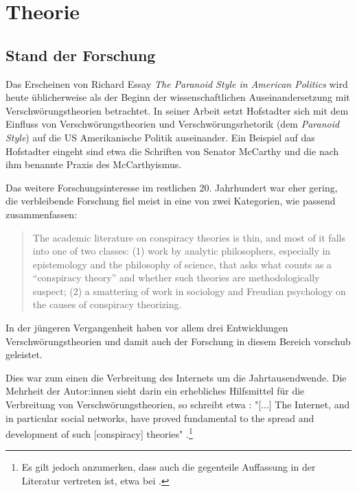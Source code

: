 \section{Theorie}

\subsection{Stand der Forschung}

Das Erscheinen von Richard \textcite{hofstadter_2008} Essay \textit{The Paranoid Style in American Politics} wird heute üblicherweise als der Beginn der wissenschaftlichen Auseinandersetzung mit Verschwörungstheorien betrachtet.
In seiner Arbeit setzt Hofstadter sich mit dem Einfluss von Verschwörungstheorien und Verschwörungsrhetorik (dem \textit{Paranoid Style}) auf die US Amerikanische Politik auseinander.
Ein Beispiel auf das Hofstadter eingeht sind etwa die Schriften von Senator McCarthy und die nach ihm benannte Praxis des McCarthyismus.

Das weitere Forschungsinteresse im restlichen 20. Jahrhundert war eher gering, die verbleibende Forschung fiel meist in eine von zwei Kategorien, wie \textcite{sunstein_2008} passend zusammenfassen:

\begin{quotation}
    The academic literature on conspiracy theories is thin, and most of it falls into one 
    of two classes: (1) work by analytic philosophers, especially in epistemology and the 
    philosophy of science, that asks what counts as a “conspiracy theory” and whether such theories are methodologically suspect; (2) a smattering of work in sociology and Freudian psychology on the causes of conspiracy theorizing. \parencite[][2]{sunstein_2008}
\end{quotation}

In der jüngeren Vergangenheit haben vor allem drei Entwicklungen Verschwörungstheorien und damit auch der Forschung in diesem Bereich vorschub geleistet.

Dies war zum einen die Verbreitung des Internets um die Jahrtausendwende.
Die Mehrheit der Autor:innen sieht darin ein erhebliches Hilfsmittel für die Verbreitung von Verschwörungstheorien, so schreibt etwa \textcite{stano_2020}: "[...] The Internet, and in particular social networks, have proved fundamental to the spread and development of such [conspiracy] theories" \parencite[][492]{stano_2020}.\footnote{Es gilt jedoch anzumerken, dass auch die gegenteile Auffassung in der Literatur vertreten ist, etwa bei \textcite{clarke_2007}.}

